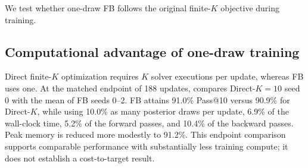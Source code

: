 We test whether one-draw FB follows the original finite-$K$ objective during
training.

\subsection{Computational advantage of one-draw training}
\label{sec:computational-efficiency}

Direct finite-$K$ optimization requires $K$ solver executions per update,
whereas FB uses one.
At the matched endpoint of 188 updates,
 compares Direct-$K{=}10$ seed 0 with
the mean of FB seeds 0--2. FB attains 91.0\% Pass@10 versus 90.9\% for
Direct-$K$, while using 10.0\% as many posterior draws per update, 6.9\% of
the wall-clock time, 5.2\% of the forward passes, and 10.4\% of the backward
passes. Peak memory is reduced more modestly to 91.2\%. This endpoint
comparison supports comparable performance with substantially less training
compute; it does not establish a cost-to-target result.

